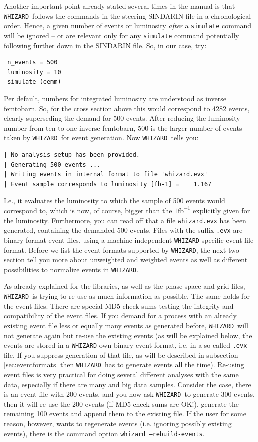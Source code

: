 \documentclass[12pt]{book}
\newcommand{\ttt}[1]{\texttt{#1}}
\newcommand{\whizard}{\texttt{WHIZARD}}
\newcommand{\fb}{\textrm{fb}}
\begin{document}
Another important point already stated several times in the manual is
that \whizard\ follows the commands in the steering SINDARIN file in a
chronological order. Hence, a given number of events or luminosity
{\em after} a \ttt{simulate} command will be ignored -- or are
relevant only for any \ttt{simulate} command potentially following
further down in the SINDARIN file. So, in our case, try:
\begin{verbatim}
 n_events = 500
 luminosity = 10
 simulate (eemm)
\end{verbatim}
Per default, numbers for integrated luminosity are understood as
inverse femtobarn. So, for the cross section above this would
correspond to 4282 events, clearly superseding the demand for 500
events. After reducing the luminosity number from ten to one inverse
femtobarn, 500 is the larger number of events taken by \whizard\ for
event generation. Now \whizard\ tells you:
\begin{verbatim}
| No analysis setup has been provided.
| Generating 500 events ...
| Writing events in internal format to file 'whizard.evx'
| Event sample corresponds to luminosity [fb-1] =    1.167
\end{verbatim}
I.e., it evaluates the luminosity to which the sample of 500 events
would correspond to, which is now, of course, bigger than the $1
\fb^{-1}$ explicitly given for the luminosity. Furthermore, you can
read off that a file \ttt{whizard.evx} has been generated, containing
the demanded 500 events. Files with the suffix \ttt{.evx} are binary
format event files, using a machine-independent \whizard-specific
event file format. Before we list the event formats supported by
\whizard, the next two section tell you more about unweighted and
weighted events as well as different possibilities to normalize events
in \whizard.

As already explained for the libraries, as well as the phase space and
grid files, \whizard\ is trying to re-use as much information as
possible. The same holds for the event files. There are special MD5
check sums testing the integrity and compatibility of the event
files. If you demand for a process with an already existing event file
less or equally many events as generated before, \whizard\ will not
generate again but re-use the existing events (as will be explained
below, the events are stored in a \whizard-own binary event format,
i.e. in a so-called \ttt{.evx} file. If you suppress generation of
that file, as will be described in subsection \ref{sec:eventformats}
then \whizard\ has to generate events all the time). Re-using event
files is very practical for doing several different analyses with the
same data, especially if there are many and big data samples. Consider
the case, there is an event file with 200 events, and you now ask
\whizard\ to generate 300 events, then it will re-use the 200 events
(if MD5 check sums are OK!), generate the remaining 100 events and
append them to the existing file. If the user for some reason,
however, wants to regenerate events (i.e. ignoring possibly existing
events), there is the command option \ttt{whizard --rebuild-events}.
\end{document}
